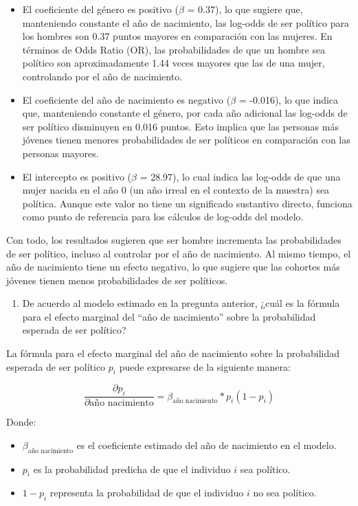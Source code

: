 \documentclass[
  12pt,
  a4paper,
]{article}
\providecommand{\tightlist}{%
  \setlength{\itemsep}{0pt}\setlength{\parskip}{0pt}}
\begin{document}
\begin{itemize}
\item
  El coeficiente del género es positivo (\(\beta\) = 0.37), lo que sugiere que, manteniendo constante el año de nacimiento, las log-odds de ser político para los hombres son 0.37 puntos mayores en comparación con las mujeres. En términos de Odds Ratio (OR), las probabilidades de que un hombre sea político son aproximadamente 1.44 veces mayores que las de una mujer, controlando por el año de nacimiento.
\item
  El coeficiente del año de nacimiento es negativo (\(\beta\) = -0.016), lo que indica que, manteniendo constante el género, por cada año adicional las log-odds de ser político disminuyen en 0.016 puntos. Esto implica que las personas más jóvenes tienen menores probabilidades de ser políticos en comparación con las personas mayores.
\item
  El intercepto es positivo (\(\beta\) = 28.97), lo cual indica las log-odds de que una mujer nacida en el año 0 (un año irreal en el contexto de la muestra) sea política. Aunque este valor no tiene un significado sustantivo directo, funciona como punto de referencia para los cálculos de log-odds del modelo.
\end{itemize}

Con todo, los resultados sugieren que ser hombre incrementa las probabilidades de ser político, incluso al controlar por el año de nacimiento. Al mismo tiempo, el año de nacimiento tiene un efecto negativo, lo que sugiere que las cohortes más jóvenes tienen menos probabilidades de ser políticos.

\begin{enumerate}
\def\labelenumi{\arabic{enumi}.}
\setcounter{enumi}{3}
\tightlist
\item
  De acuerdo al modelo estimado en la pregunta anterior, ¿cuál es la fórmula para el efecto marginal del ``año de nacimiento'' sobre la probabilidad esperada de ser político?
\end{enumerate}

La fórmula para el efecto marginal del año de nacimiento sobre la probabilidad esperada de ser político \(p_i\) puede expresarse de la siguiente manera:

\[\frac{\partial p_i}{\partial\text{año nacimiento}} = \beta_\text{año nacimiento} * p_i(1-p_i)
\]

Donde:

\begin{itemize}
\tightlist
\item
  \(\beta_{\text{año nacimiento}}\) es el coeficiente estimado del año de nacimiento en el modelo.
\item
  \(p_i\) es la probabilidad predicha de que el individuo \(i\) sea político.
\item
  \(1 - p_i\) representa la probabilidad de que el individuo \(i\) no sea político.
\end{itemize}
\end{document}
